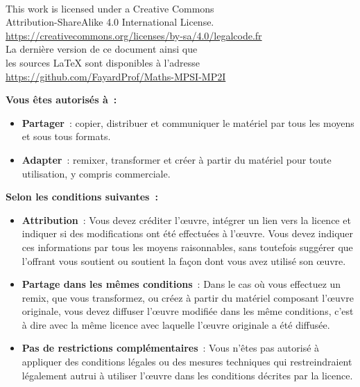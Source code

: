 \documentclass[book]{magnolia}
\begin{document}
\begin{center}
  \ccbysa\\
  \vspace{2ex}
  This work is licensed under a Creative Commons\\
  Attribution-ShareAlike 4.0 International License.\\
  \url{https://creativecommons.org/licenses/by-sa/4.0/legalcode.fr}\\
  \vspace{2ex}
  La dernière version de ce document ainsi que\\
  les sources \LaTeX{} sont disponibles à l'adresse\\
  \url{https://github.com/FayardProf/Maths-MPSI-MP2I}
  \end{center}
  \vspace{2ex}
  \begin{center}
  \textbf{Vous êtes autorisés à~:}
  \end{center}
  \vspace{2ex}
  \begin{itemize}
  \item \textbf{Partager}~: copier, distribuer et communiquer le matériel par tous les moyens et sous tous formats.
  \item \textbf{Adapter}~: remixer, transformer et créer à partir du matériel
  pour toute utilisation, y compris commerciale.
  \end{itemize}
  \vspace{2ex}
  \begin{center}
  \textbf{Selon les conditions suivantes~:}
  \end{center}
  \vspace{2ex}
  \begin{itemize}
    \item \textbf{Attribution}~: Vous devez créditer l'œuvre, intégrer un lien vers la licence et indiquer si des modifications ont été effectuées à l'œuvre. Vous devez indiquer ces informations par tous les moyens raisonnables, sans toutefois suggérer que l'offrant vous soutient ou soutient la façon dont vous avez utilisé son œuvre.
    \item \textbf{Partage dans les mêmes conditions}~: Dans le cas où vous effectuez un remix, que vous transformez, ou créez à partir du matériel composant l'œuvre originale, vous devez diffuser l'œuvre modifiée dans les même conditions, c'est à dire avec la même licence avec laquelle l'œuvre originale a été diffusée.
    \item \textbf{Pas de restrictions complémentaires}~: Vous n'êtes pas autorisé à appliquer des conditions légales ou des mesures techniques qui restreindraient légalement autrui à utiliser l'œuvre dans les conditions décrites par la licence.
    \end{itemize}
\end{document}
